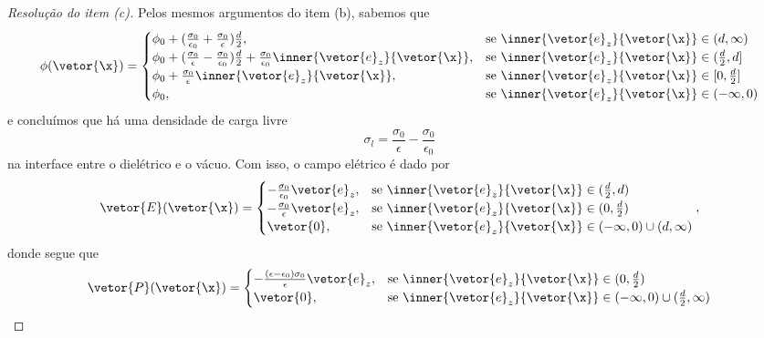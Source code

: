 \begin{proof}[Resolução do item (c)]
    Pelos mesmos argumentos do item (b), sabemos que
    \begin{equation*}
        \phi(\vetor{\x}) = \begin{cases}
            \phi_0 + (\frac{\sigma_0}{\epsilon_0} + \frac{\sigma_0}{\epsilon})\frac{d}{2}, &\text{se }\inner{\vetor{e}_z}{\vetor{\x}} \in(d, \infty)\\
            \phi_0 + (\frac{\sigma_0}{\epsilon} - \frac{\sigma_0}{\epsilon_0})\frac{d}{2} + \frac{\sigma_0}{\epsilon_0}\inner{\vetor{e}_z}{\vetor{\x}},&\text{se }\inner{\vetor{e}_z}{\vetor{\x}} \in (\frac{d}{2}, d]\\
            \phi_0 + \frac{\sigma_0}{\epsilon}\inner{\vetor{e}_z}{\vetor{\x}},&\text{se }\inner{\vetor{e}_z}{\vetor{\x}} \in [0,\frac{d}{2}]\\
            \phi_0, &\text{se }\inner{\vetor{e}_z}{\vetor{\x}} \in (-\infty, 0)
        \end{cases}
    \end{equation*}
    e concluímos que há uma densidade de carga livre
    \begin{equation*}
        \sigma_l = \frac{\sigma_0}{\epsilon} - \frac{\sigma_0}{\epsilon_0}
    \end{equation*}
    na interface entre o dielétrico e o vácuo. Com isso, o campo elétrico é dado por
    \begin{equation*}
        \vetor{E}(\vetor{\x}) = \begin{cases}
            - \frac{\sigma_0}{\epsilon_0}\vetor{e}_z,&\text{se }\inner{\vetor{e}_z}{\vetor{\x}} \in (\frac{d}{2},d)\\
            - \frac{\sigma_0}{\epsilon}\vetor{e}_z,&\text{se }\inner{\vetor{e}_z}{\vetor{\x}} \in (0,\frac{d}{2})\\
            \vetor{0}, &\text{se }\inner{\vetor{e}_z}{\vetor{\x}} \in (-\infty, 0) \cup (d, \infty)
        \end{cases},
    \end{equation*}
    donde segue que
    \begin{equation*}
        \vetor{P}(\vetor{\x}) = \begin{cases}
            - \frac{(\epsilon - \epsilon_0)\sigma_0}{\epsilon}\vetor{e}_z,&\text{se }\inner{\vetor{e}_z}{\vetor{\x}} \in (0,\frac{d}{2})\\
            \vetor{0}, &\text{se }\inner{\vetor{e}_z}{\vetor{\x}} \in (-\infty, 0) \cup (\frac{d}{2}, \infty)
        \end{cases}

\end{equation*}
\end{proof}
